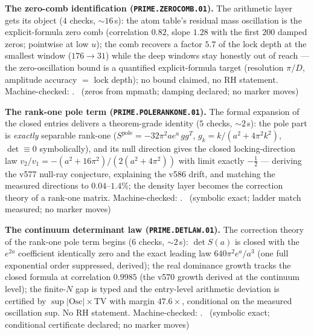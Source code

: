 \par\smallskip\noindent\textbf{The zero-comb identification
(\texttt{PRIME.ZEROCOMB.01}).}
The arithmetic layer gets its object ($4$ checks, ${\sim}16$\,s): the
atom table's residual mass oscillation is the explicit-formula zero
comb (correlation $0.82$, slope $1.28$ with the first $200$ damped
zeros; pointwise at low $u$); the comb recovers a factor $5.7$ of the
lock depth at the smallest window ($176\to31$) while the deep windows
stay honestly out of reach --- the zero-oscillation bound is a
quantified explicit-formula target (resolution $\pi/D$, amplitude
accuracy $=$ lock depth); no bound claimed, no RH statement.
Machine-checked: .
\mE\ (zeros from mpmath; damping declared; no marker moves)
\par\smallskip


\par\smallskip\noindent\textbf{The rank-one pole term
(\texttt{PRIME.POLERANKONE.01}).}
The formal expansion of the closed entries delivers a theorem-grade
identity ($5$ checks, ${\sim}2$\,s): the pole part is \emph{exactly}
separable rank-one ($S^{\mathrm{pole}}=-32\pi^2ae^a\,gg^T$,
$g_k=k/(a^2+4\pi^2k^2)$, $\det\equiv0$ symbolically), and its null
direction gives the closed locking-direction law
$v_2/v_1=-(a^2+16\pi^2)/(2(a^2+4\pi^2))$ with limit exactly
$-\tfrac12$ --- deriving the v577 null-ray conjecture, explaining the
v586 drift, and matching the measured directions to $0.04$--$1.4\%$;
the density layer becomes the correction theory of a rank-one matrix.
Machine-checked: .
\mE\ (symbolic exact; ladder match measured; no marker moves)
\par\smallskip


\par\smallskip\noindent\textbf{The continuum determinant law
(\texttt{PRIME.DETLAW.01}).}
The correction theory of the rank-one pole term begins ($6$ checks,
${\sim}2$\,s): $\det S(a)$ is closed with the $e^{2a}$ coefficient
identically zero and the exact leading law $640\pi^2e^a/a^3$ (one full
exponential order suppressed, derived); the real dominance growth
tracks the closed formula at correlation $0.9985$ (the v570 growth
derived at the continuum level); the finite-$N$ gap is typed and the
entry-level arithmetic deviation is certified by
$\sup|\mathrm{Osc}|\times\mathrm{TV}$ with margin $47.6\times$,
conditional on the measured oscillation sup.  No RH statement.
Machine-checked: .
\mE\ (symbolic exact; conditional certificate declared; no marker
moves)
\par\smallskip


